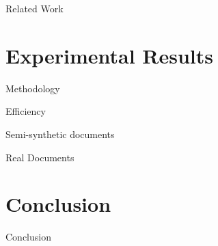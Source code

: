 \documentclass{lecture}
\begin{document}
\begin{plain}{Related Work}
\end{plain}

\section[Results]{Experimental Results}
\begin{plain}{Methodology}
\end{plain}

\begin{plain}{Efficiency}
\end{plain}

\begin{plain}{Semi-synthetic documents}
\end{plain}

\begin{plain}{Real Documents}
\end{plain}


\section[Conclusion]{Conclusion}
\begin{plain}{Conclusion}
\end{plain}
\end{document}
